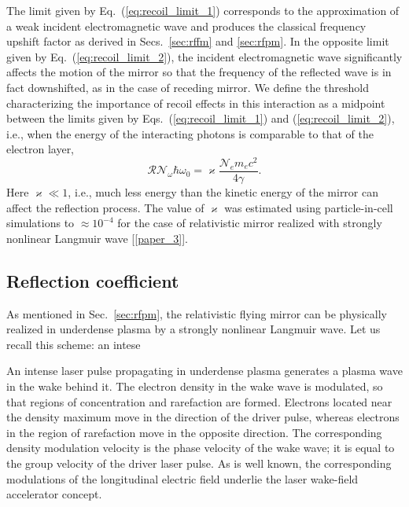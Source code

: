 \documentclass[10pt, a4paper, twoside, openright]{report}
\begin{document}
The limit given by Eq.~(\ref{eq:recoil_limit_1}) corresponds to the approximation of a weak incident electromagnetic wave and produces the classical frequency upshift factor as derived in Secs.~\ref{sec:rffm} and \ref{sec:rfpm}. In the opposite limit given by Eq.~(\ref{eq:recoil_limit_2}), the incident electromagnetic wave significantly affects the motion of the mirror so that the frequency of the reflected wave is in fact downshifted, as in the case of receding mirror. We define the threshold characterizing the importance of recoil effects in this interaction as a midpoint between the limits given by Eqs.~(\ref{eq:recoil_limit_1}) and (\ref{eq:recoil_limit_2}), i.e., when the energy of the interacting photons is comparable to that of the electron layer,
\begin{equation}\label{eq:recoil_threshold}
	\mathcal{R} \mathcal{N}_{\omega} \hbar  \omega_0 = \varkappa \frac{\mathcal{N}_e m_e c^2}{4 \gamma}.
\end{equation}
Here $ \varkappa \ll 1 $, i.e., much less energy than the kinetic energy of the mirror can affect the reflection process. The value of $ \varkappa $ was estimated using particle-in-cell simulations to $ \approx 10^{-4} $ for the case of relativistic mirror realized with strongly nonlinear Langmuir wave [\ref{paper_3}].

\subsection{Reflection coefficient}

As mentioned in Sec.~\ref{sec:rfpm}, the relativistic flying mirror can be physically realized in underdense plasma by a strongly nonlinear Langmuir wave. Let us recall this scheme: an intese 

An intense laser pulse propagating in underdense plasma generates a plasma wave in the wake behind it. The electron density in the wake wave is modulated, so that regions of concentration and rarefaction are formed. Electrons located near the density maximum move in the direction of the driver pulse, whereas electrons in the region of rarefaction move in the opposite direction. The corresponding density modulation velocity is the phase velocity of the wake wave; it is equal to the group velocity of the driver laser pulse. As is well known, the corresponding modulations of the longitudinal electric field underlie the laser wake-field accelerator concept.
\end{document}
